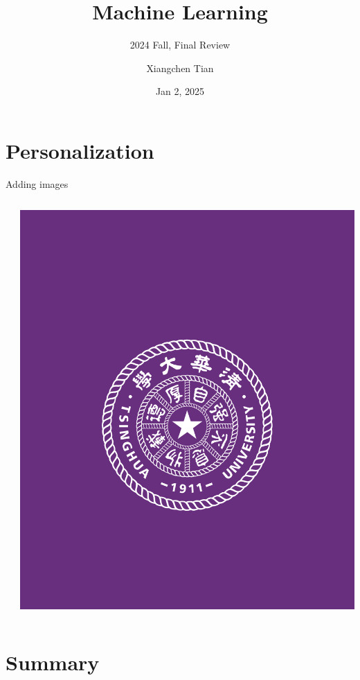 \documentclass{beamer}
\title{Machine Learning}
\subtitle{2024 Fall, Final Review}
\author{Xiangchen Tian}
\date{Jan 2, 2025}
\begin{document}
\maketitle

















\begin{frame}[fragile]{}
\framesubtitle{}
\end{frame}

\section{Personalization}

\begin{frame}[fragile]{Adding images}
\begin{columns}
\begin{column}{0.7\textwidth}

\end{column}
\begin{column}{0.3\textwidth}
\includegraphics[width=\textwidth]
{assets/logo_RGB}
\end{column}
\end{columns}
\end{frame}

\section{Summary}


\backmatter
\end{document}
